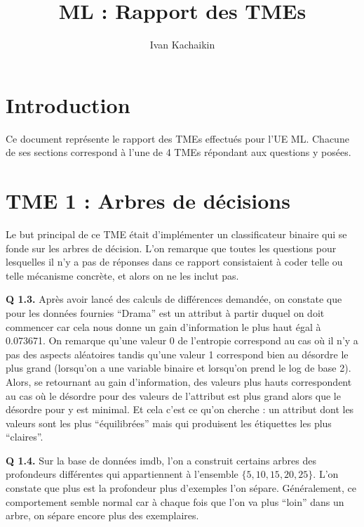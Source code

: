 \documentclass[a4paper,11pt]{article}
\theoremstyle{plain}
\theoremstyle{definition}
\begin{document}


\pagestyle{plain}

\title{ML : Rapport des TMEs}
\author{Ivan Kachaikin}
\date{}
\maketitle


\section{Introduction}
Ce document représente le rapport des TMEs effectués pour l'UE ML. Chacune de ses sections correspond à l'une de 4 TMEs répondant aux questions y posées.

\section{TME 1 : Arbres de décisions}
\label{tme1}
Le but principal de ce TME était d'implémenter un classificateur binaire qui se fonde sur les arbres de décision. L'on remarque que toutes les questions pour lesquelles il n'y a pas de réponses dans ce rapport consistaient à coder telle ou telle mécanisme concrète, et alors on ne les inclut pas.

\textbf{Q 1.3.} Après avoir lancé des calculs de différences demandée, on constate que pour les données fournies ``Drama'' est un attribut à partir duquel on doit commencer car cela nous donne un gain d'information le plus haut égal à 0.073671. On remarque qu'une valeur 0 de l'entropie correspond au cas où il n'y a pas des aspects aléatoires tandis qu'une valeur 1 correspond bien au désordre le plus grand (lorsqu'on a une variable binaire et lorsqu'on prend le log de base 2). Alors, se retournant au gain d'information, des valeurs plus hauts correspondent au cas où le désordre pour des valeurs de l'attribut est plus grand alors que le désordre pour y est minimal. Et cela c'est ce qu'on cherche : un attribut dont les valeurs sont les plus 
``équilibrées'' mais qui produisent les étiquettes les plus ``claires''.

\textbf{Q 1.4.} Sur la base de données imdb, l'on a construit certains arbres des profondeurs différentes qui appartiennent à l'ensemble $\{5, 10, 15, 20, 25\}$. L'on constate que plus est la profondeur plus d'exemples l'on sépare. Généralement, ce comportement semble normal car à chaque fois que l'on va plus ``loin'' dans un arbre, on sépare encore plus des exemplaires.
\end{document}
